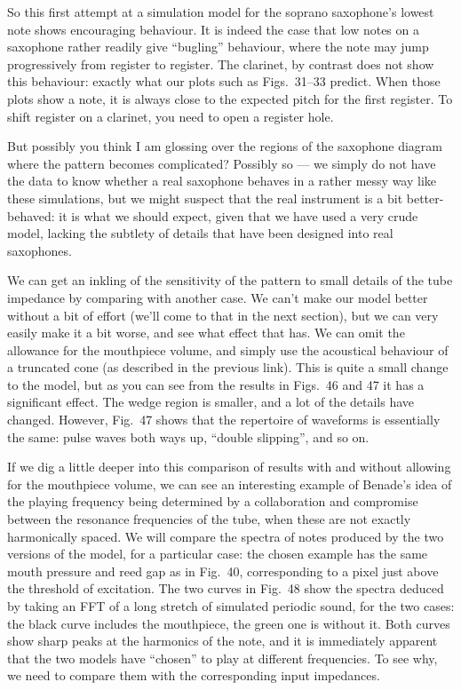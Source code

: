   So this first attempt at a simulation model for the soprano saxophone’s 
  lowest note shows encouraging behaviour. It is indeed the case that low notes 
  on a saxophone rather readily give ``bugling'' behaviour, where the note may 
  jump progressively from register to register. The clarinet, by contrast does 
  not show this behaviour: exactly what our plots such as Figs.\ 31--33 
  predict. When those plots show a note, it is always close to the expected 
  pitch for the first register. To shift register on a clarinet, you need to 
  open a register hole. 

  But possibly you think I am glossing over the regions of the saxophone 
  diagram where the pattern becomes complicated? Possibly so --- we simply do 
  not have the data to know whether a real saxophone behaves in a rather messy 
  way like these simulations, but we might suspect that the real instrument is 
  a bit better-behaved: it is what we should expect, given that we have used a 
  very crude model, lacking the subtlety of details that have been designed 
  into real saxophones. 

  We can get an inkling of the sensitivity of the pattern to small details of 
  the tube impedance by comparing with another case. We can’t make our model 
  better without a bit of effort (we'll come to that in the next section), but 
  we can very easily make it a bit worse, and see what effect that has. We can 
  omit the allowance for the mouthpiece volume, and simply use the acoustical 
  behaviour of a truncated cone (as described in the previous link). This is 
  quite a small change to the model, but as you can see from the results in 
  Figs.\ 46 and 47 it has a significant effect. The wedge region is smaller, 
  and a lot of the details have changed. However, Fig.\ 47 shows that the 
  repertoire of waveforms is essentially the same: pulse waves both ways up, 
  “double slipping”, and so on. 

  If we dig a little deeper into this comparison of results with and without 
  allowing for the mouthpiece volume, we can see an interesting example of 
  Benade’s idea of the playing frequency being determined by a collaboration 
  and compromise between the resonance frequencies of the tube, when these are 
  not exactly harmonically spaced. We will compare the spectra of notes 
  produced by the two versions of the model, for a particular case: the chosen 
  example has the same mouth pressure and reed gap as in Fig.\ 40, 
  corresponding to a pixel just above the threshold of excitation. The two 
  curves in Fig.\ 48 show the spectra deduced by taking an FFT of a long 
  stretch of simulated periodic sound, for the two cases: the black curve 
  includes the mouthpiece, the green one is without it. Both curves show sharp 
  peaks at the harmonics of the note, and it is immediately apparent that the 
  two models have ``chosen'' to play at different frequencies. To see why, we 
  need to compare them with the corresponding input impedances. 


